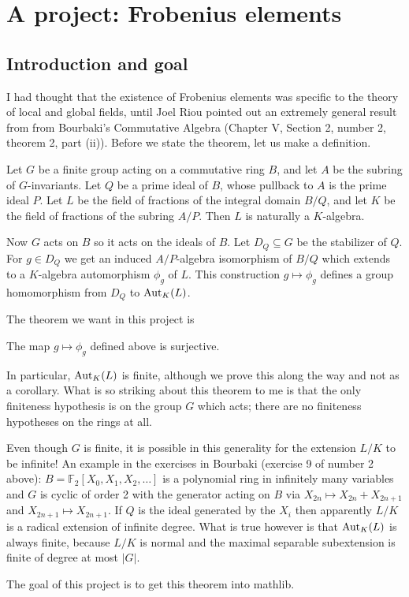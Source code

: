 \chapter{A project: Frobenius elements}

\section{Introduction and goal}

I had thought that the existence of Frobenius elements was specific to the theory
of local and global fields, until Joel Riou pointed out
an extremely general result from from Bourbaki's Commutative Algebra
(Chapter V, Section 2, number 2, theorem 2, part (ii)). Before we state the
theorem, let us make a definition.

\begin{definition}
  \label{Pointwise.stabilizer.toGaloisGroup}
  Let $G$ be a finite group acting on a commutative ring $B$, and let $A$
  be the subring of $G$-invariants. Let $Q$ be a prime ideal of $B$, whose
  pullback to $A$ is the prime ideal $P$. Let $L$ be the field of fractions
  of the integral domain $B/Q$, and let $K$ be the field of fractions
  of the subring $A/P$. Then $L$ is naturally a $K$-algebra.

  Now $G$ acts on $B$ so it acts on the ideals of $B$. Let $D_Q\subseteq G$ be the
  stabilizer of $Q$. For $g\in D_Q$ we get an induced $A/P$-algebra isomorphism
  of $B/Q$ which extends to a $K$-algebra automorphism $\phi_g$ of $L$.
  This construction $g\mapsto \phi_g$ defines a group homomorphism from $D_Q$
  to $\operatorname{Aut}_K(L)$.
  \leanok
\end{definition}

The theorem we want in this project is
\begin{theorem}
  \label{MulAction.stabilizer_surjective_of_action}
  The map $g\mapsto \phi_g$ defined above is surjective.
\end{theorem}

In particular, $\operatorname{Aut}_K(L)$ is finite, although we prove this along the way and not
as a corollary. What is so striking about this theorem to me is that the only finiteness hypothesis
is on the group $G$ which acts; there are no finiteness hypotheses on the rings at all.

Even though $G$ is finite, it is possible in this generality for the extension $L/K$ to be infinite!
An example in the exercises in Bourbaki (exercise 9 of number 2 above):
$B=\mathbb{F}_2[X_0,X_1,X_2,\ldots]$
is a polynomial ring in infinitely many variables and $G$ is cyclic of order 2 with
the generator acting on $B$ via $X_{2n}\mapsto X_{2n}+X_{2n+1}$ and $X_{2n+1}\mapsto X_{2n+1}$.
If $Q$ is the ideal generated by the $X_i$ then apparently $L/K$ is a radical extension of
infinite degree. What is true however is that $\operatorname{Aut}_K(L)$ is always finite, because
$L/K$ is normal and the maximal separable subextension is finite of degree at most $|G|$.

The goal of this project is to get this theorem into mathlib.
